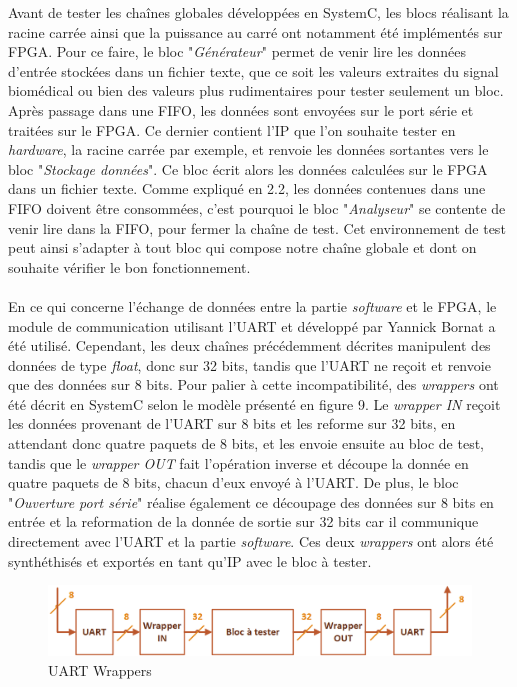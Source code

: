 \documentclass[a4paper,12pt]{article}
\begin{document}
Avant de tester les chaînes globales développées en SystemC, les blocs réalisant la racine carrée ainsi que la puissance au carré ont notamment été implémentés sur FPGA. Pour ce faire, le bloc "\textit{Générateur}" permet de venir lire les données d'entrée stockées dans un fichier texte, que ce soit les valeurs extraites du signal biomédical ou bien des valeurs plus rudimentaires pour tester seulement un bloc. Après passage dans une FIFO, les données sont envoyées sur le port série et traitées sur le FPGA. Ce dernier contient l'IP que l'on souhaite tester en \textit{hardware}, la racine carrée par exemple, et renvoie les données sortantes vers le bloc "\textit{Stockage données}". Ce bloc écrit alors les données calculées sur le FPGA dans un fichier texte. Comme expliqué en 2.2, les données contenues dans une FIFO doivent être consommées, c'est pourquoi le bloc "\textit{Analyseur}" se contente de venir lire dans la FIFO, pour fermer la chaîne de test. Cet environnement de test peut ainsi s'adapter à tout bloc qui compose notre chaîne globale et dont on souhaite vérifier le bon fonctionnement. \\ \\
\indent En ce qui concerne l'échange de données entre la partie \textit{software} et le FPGA, le module de communication utilisant l'UART et développé par Yannick Bornat a été utilisé. Cependant, les deux chaînes précédemment décrites manipulent des données de type \textit{float}, donc sur 32 bits, tandis que l'UART ne reçoit et renvoie que des données sur 8 bits. Pour palier à cette incompatibilité, des \textit{wrappers} ont été décrit en SystemC selon le modèle présenté en figure 9. Le \textit{wrapper IN} reçoit les données provenant de l'UART sur 8 bits et les reforme sur 32 bits, en attendant donc quatre paquets de 8 bits, et les envoie ensuite au bloc de test, tandis que le \textit{wrapper OUT} fait l'opération inverse et découpe la donnée en quatre paquets de 8 bits, chacun d'eux envoyé à l'UART. De plus, le bloc "\textit{Ouverture port série}" réalise également ce découpage des données sur 8 bits en entrée et la reformation de la donnée de sortie sur 32 bits car il communique directement avec l'UART et la partie \textit{software}. Ces deux \textit{wrappers} ont alors été synthéthisés et exportés en tant qu'IP avec le bloc à tester.  
\begin{figure}[H]
\centering
\includegraphics[width=\textwidth]{Dessin7.png}
\caption{UART Wrappers}
\end{figure}   
\end{document}

